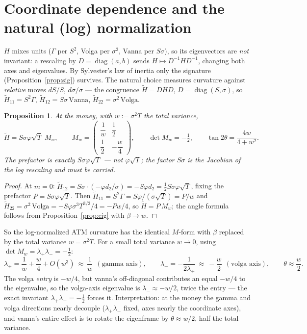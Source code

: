 \documentclass[11pt]{article}
\newtheorem{proposition}{Proposition}
\begin{document}
\section{Coordinate dependence and the natural (log) normalization}
$H$ mixes units ($\Gamma$ per $S^2$, Volga per $\sigma^2$, Vanna per $S\sigma$), so its eigenvectors are
\emph{not} invariant: a rescaling by $D=\operatorname{diag}(a,b)$ sends $H\mapsto D^{-1}HD^{-1}$, changing
both axes and eigenvalues. By Sylvester's law of inertia only the signature (Proposition~\ref{prop:sig})
survives. The natural choice measures curvature against \emph{relative} moves $dS/S$, $d\sigma/\sigma$ ---
the congruence $\tilde H=DHD$, $D=\operatorname{diag}(S,\sigma)$, so $\tilde H_{11}=S^2\Gamma$,
$\tilde H_{12}=S\sigma\,\text{Vanna}$, $\tilde H_{22}=\sigma^2\,\text{Volga}$.
\begin{proposition}\label{prop:tilde}
At the money, with $w:=\sigma^2T$ the total variance,
\[
\tilde H=S\sigma\varphi\sqrt T\;M_w,\qquad
M_w=\begin{pmatrix}\dfrac1w&\dfrac12\\[6pt]\dfrac12&-\dfrac w4\end{pmatrix},\qquad
\det M_w=-\tfrac12,\qquad
\tan2\theta=\frac{4w}{4+w^2}.
\]
The prefactor is exactly $S\sigma\varphi\sqrt T$ --- \emph{not} $\varphi\sqrt T$; the factor $S\sigma$
is the Jacobian of the log rescaling and must be carried.
\end{proposition}
\begin{proof}
At $m=0$: $\tilde H_{12}=S\sigma\cdot(-\varphi d_2/\sigma)=-S\varphi d_2=\tfrac12 S\sigma\varphi\sqrt T$,
fixing the prefactor $P=S\sigma\varphi\sqrt T$. Then $\tilde H_{11}=S^2\Gamma=S\varphi/(\sigma\sqrt T)=P/w$
and $\tilde H_{22}=\sigma^2\,\text{Volga}=-S\varphi\sigma^3T^{3/2}/4=-Pw/4$, so $\tilde H=P\,M_w$; the
angle formula follows from Proposition~\ref{prop:eig} with $\beta\to w$.
\end{proof}
So the log-normalized ATM curvature has the identical $M$-form with $\beta$ replaced by the total
variance $w=\sigma^2T$. For a small total variance $w\to0$, using $\det M_w=\lambda_+\lambda_-=-\tfrac12$:
\[
\lambda_+=\frac1w+\frac w4+O(w^3)\ \approx\ \frac1w\ \ (\text{gamma axis}),\qquad
\lambda_-=-\frac1{2\lambda_+}\ \approx\ -\frac w2\ \ (\text{volga axis}),\qquad
\theta\approx\frac w2 .
\]
The volga \emph{entry} is $-w/4$, but vanna's off-diagonal contributes an equal $-w/4$ to the eigenvalue,
so the volga-axis eigenvalue is $\lambda_-\approx-w/2$, twice the entry --- the exact invariant
$\lambda_+\lambda_-=-\tfrac12$ forces it. Interpretation: at the money the gamma and volga directions
nearly decouple ($\lambda_+\lambda_-$ fixed, axes nearly the coordinate axes), and vanna's entire effect
is to rotate the eigenframe by $\theta\approx w/2$, half the total variance.
\end{document}
